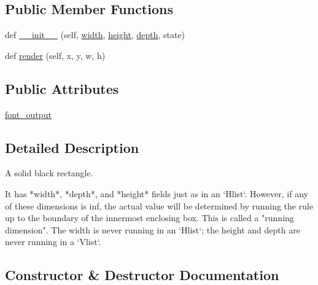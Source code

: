\subsection*{Public Member Functions}
\begin{DoxyCompactItemize}
\item 
def \hyperlink{classmatplotlib_1_1__mathtext_1_1Rule_ac40ba3e7704830cb639cedf843a408a9}{\+\_\+\+\_\+init\+\_\+\+\_\+} (self, \hyperlink{classmatplotlib_1_1__mathtext_1_1Box_ae1a5ebb887d52c6e1da379a2265d04cb}{width}, \hyperlink{classmatplotlib_1_1__mathtext_1_1Box_a1cf957faa63df8993e57d9bcc8f1ef0f}{height}, \hyperlink{classmatplotlib_1_1__mathtext_1_1Box_aec283c7293e1d387b79c21c905a27afe}{depth}, state)
\item 
def \hyperlink{classmatplotlib_1_1__mathtext_1_1Rule_a3b4af54adb71d77883f9628baf8f7e8a}{render} (self, x, y, w, h)
\end{DoxyCompactItemize}
\subsection*{Public Attributes}
\begin{DoxyCompactItemize}
\item 
\hyperlink{classmatplotlib_1_1__mathtext_1_1Rule_ac991bd7a782be3d78281d43c3bd85e08}{font\+\_\+output}
\end{DoxyCompactItemize}


\subsection{Detailed Description}
\begin{DoxyVerb}A solid black rectangle.

It has *width*, *depth*, and *height* fields just as in an `Hlist`.
However, if any of these dimensions is inf, the actual value will be
determined by running the rule up to the boundary of the innermost
enclosing box.  This is called a "running dimension".  The width is never
running in an `Hlist`; the height and depth are never running in a `Vlist`.
\end{DoxyVerb}
 

\subsection{Constructor \& Destructor Documentation}
\mbox{\label{classmatplotlib_1_1__mathtext_1_1Rule_ac40ba3e7704830cb639cedf843a408a9}} 
